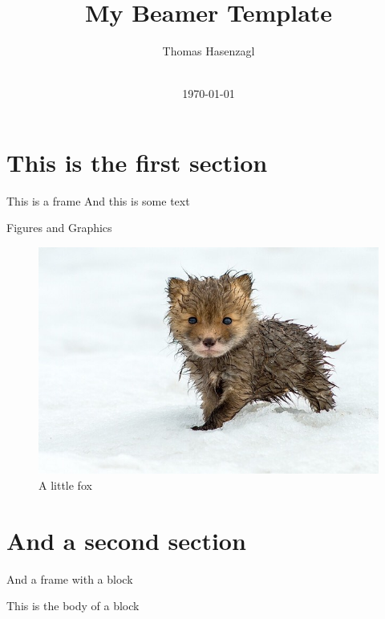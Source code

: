 \documentclass[xcolor=svgnames, 10pt]{beamer}
\begin{document}
{ 

\begin{frame}
    \title{\LARGE{My Beamer Template}}
    \author{Thomas Hasenzagl}
\date{
	\\
	\vspace{1cm}
	\today
    }
\titlepage    
\end{frame}}


\section{This is the first section} 


\begin{frame}{This is a frame}
    And this is some text
\end{frame}


\begin{frame}{Figures and Graphics}
    \begin{figure}
        \centering
        \includegraphics[scale=0.3]{fox}
        \caption{A little fox}
    \end{figure}
\end{frame}


\section{And a second section}


\begin{frame}{And a frame with a block}

    \begin{tcolorbox}[title=This is the title of a block]
    This is the body of a block 
    \end{tcolorbox}

\end{frame}
\end{document}
